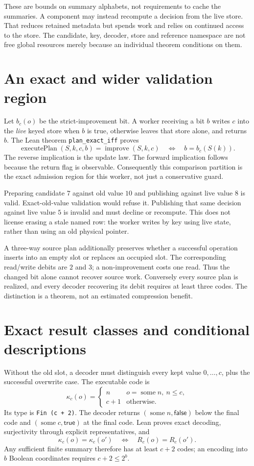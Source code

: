 \documentclass[11pt,a4paper]{article}
\newcommand{\code}[1]{\nolinkurl{#1}}
\begin{document}
These are bounds on summary alphabets, not requirements to cache the summaries.
A component may instead recompute a decision from the live store. That reduces
retained metadata but spends work and relies on continued access to the store.
The candidate, key, decoder, store and reference namespace are not free global
resources merely because an individual theorem conditions on them.

\section{An exact and wider validation region}

Let $b_c(o)$ be the strict-improvement bit. A worker receiving a bit $b$ writes
$c$ into the \emph{live} keyed store when $b$ is true, otherwise leaves that
store alone, and returns $b$. The Lean theorem \code{plan_exact_iff} proves
\[
 \operatorname{executePlan}(S,k,c,b)=\operatorname{improve}(S,k,c)
 \quad\Longleftrightarrow\quad b=b_c(S(k)).
\]
The reverse implication is the update law. The forward implication follows
because the return flag is observable. Consequently this comparison partition
is the exact admission region for this worker, not just a conservative guard.

Preparing candidate $7$ against old value $10$ and publishing against live
value $8$ is valid. Exact-old-value validation would refuse it. Publishing
that same decision against live value $5$ is invalid and must decline or
recompute. This does not license erasing a stale named row: the worker writes
by key using live state, rather than using an old physical pointer.

A three-way source plan additionally preserves whether a successful operation
inserts into an empty slot or replaces an occupied slot. The corresponding
read/write debits are $2$ and $3$; a non-improvement costs one read. Thus the
changed bit alone cannot recover source work. Conversely every source plan
is realized, and every decoder recovering its debit requires at least three
codes. The distinction is a theorem, not an estimated compression benefit.

\section{Exact result classes and conditional descriptions}

Without the old slot, a decoder must distinguish every kept value
$0,\ldots,c$, plus the successful overwrite case. The executable code is
\[
 \kappa_c(o)=\begin{cases}
 n&o=\operatorname{some}n,\ n\le c,\\
 c+1&\text{otherwise}.
 \end{cases}
\]
Its type is \code{Fin (c + 2)}. The decoder returns
$(\operatorname{some}n,\mathsf{false})$ below the final code and
$(\operatorname{some}c,\mathsf{true})$ at the final code. Lean proves exact
decoding, surjectivity through explicit representatives, and
\[
 \kappa_c(o)=\kappa_c(o')\quad\Longleftrightarrow\quad R_c(o)=R_c(o').
\]
Any sufficient finite summary therefore has at least $c+2$ codes; an encoding
into $b$ Boolean coordinates requires $c+2\le2^b$.
\end{document}
